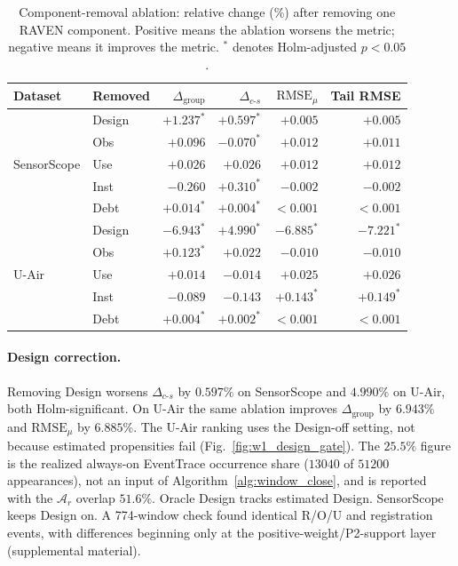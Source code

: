 \documentclass[letterpaper,journal]{IEEEtran}
\begin{document}
\begin{table}[!htbp]
\centering
\caption{Component-removal ablation: relative change (\%) after removing one RAVEN component.
Positive means the ablation worsens the metric; negative means it improves the
metric.  $^\ast$ denotes Holm-adjusted $p<0.05$.}
\label{tab:e4_ablation}
\setlength{\tabcolsep}{3.5pt}
\begin{tabular}{llrrrr}
\toprule
Dataset & Removed & $\Delta_{\mathrm{group}}$ &
$\Delta_{c\text{-}s}$ & $\mathrm{RMSE}_{\mu}$ & Tail RMSE\\
\midrule
\multirow{5}{*}{SensorScope}
& Design & $+1.237^\ast$ & $+0.597^\ast$ & $+0.005$ & $+0.005$\\
& Obs    & $+0.096$       & $-0.070^\ast$ & $+0.012$ & $+0.011$\\
& Use    & $+0.026$       & $+0.026$       & $+0.012$ & $+0.012$\\
& Inst   & $-0.260$       & $+0.310^\ast$ & $-0.002$ & $-0.002$\\
& Debt   & $+0.014^\ast$ & $+0.004^\ast$ & $<0.001$ & $<0.001$\\
\midrule
\multirow{5}{*}{U-Air}
& Design & $-6.943^\ast$ & $+4.990^\ast$ & $-6.885^\ast$ & $-7.221^\ast$\\
& Obs    & $+0.123^\ast$ & $+0.022$       & $-0.010$       & $-0.010$\\
& Use    & $+0.014$       & $-0.014$       & $+0.025$       & $+0.026$\\
& Inst   & $-0.089$       & $-0.143$       & $+0.143^\ast$ & $+0.149^\ast$\\
& Debt   & $+0.004^\ast$ & $+0.002^\ast$ & $<0.001$ & $<0.001$\\
\bottomrule
\end{tabular}
\end{table}

\paragraph{Design correction.}
Removing Design worsens $\Delta_{c\text{-}s}$ by $0.597\%$ on SensorScope and
$4.990\%$ on U-Air, both Holm-significant.  On U-Air the same ablation
improves $\Delta_{\mathrm{group}}$ by $6.943\%$ and
$\mathrm{RMSE}_{\mu}$ by $6.885\%$.  The U-Air ranking uses the Design-off
setting, not because estimated propensities fail
(Fig.~\ref{fig:w1_design_gate}).  The $25.5\%$ figure is the realized always-on
EventTrace occurrence share ($13040$ of $51200$ appearances), not an
input of Algorithm~\ref{alg:window_close}, and is reported with the $\mathcal{A}_r$ overlap
$51.6\%$.  Oracle Design tracks estimated
Design.  SensorScope keeps Design on.  A 774-window check found identical
R/O/U and registration events, with differences beginning only at the
positive-weight/P2-support layer
(supplemental material).
\end{document}

